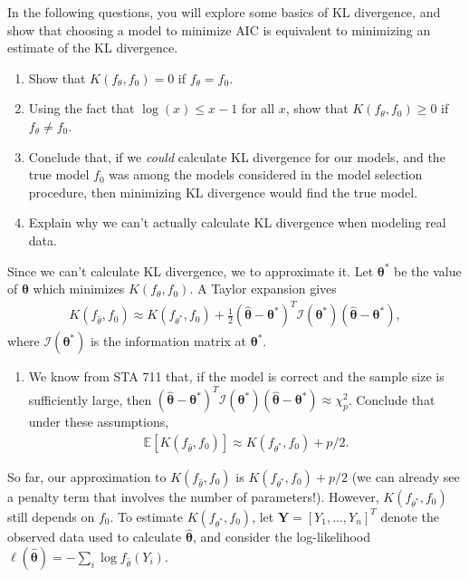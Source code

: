\documentclass[11pt]{article}
\begin{document}
\noindent In the following questions, you will explore some basics of KL divergence, and show that choosing a model to minimize AIC is equivalent to minimizing an estimate of the KL divergence.

\begin{enumerate}
\item Show that $K(f_\theta, f_0) = 0$ if $f_\theta = f_0$.

\item Using the fact that $\log(x) \leq x - 1$ for all $x$, show that $K(f_\theta, f_0) \geq 0$ if $f_\theta \neq f_0$.

\item Conclude that, if we \textit{could} calculate KL divergence for our models, and the true model $f_0$ was among the models considered in the model selection procedure, then minimizing KL divergence would find the true model.

\item Explain why we can't actually calculate KL divergence when modeling real data.
\end{enumerate}

\noindent Since we can't calculate KL divergence, we to approximate it. Let $\bm{\theta}^*$ be the value of $\bm{\theta}$ which minimizes $K(f_\theta, f_0)$. A Taylor expansion gives
\begin{align}
K(f_{\widehat{\theta}}, f_0) \approx K(f_{\theta^*}, f_0) + \frac{1}{2} (\widehat{\bm{\theta}} - \bm{\theta}^*)^T \mathcal{I}(\bm{\theta}^*) (\widehat{\bm{\theta}} - \bm{\theta}^*),
\end{align}
where $\mathcal{I}(\bm{\theta}^*)$ is the information matrix at $\bm{\theta}^*$.

\begin{enumerate}
\item We know from STA 711 that, if the model is correct and the sample size is sufficiently large, then $(\widehat{\bm{\theta}} - \bm{\theta}^*)^T \mathcal{I}(\bm{\theta}^*) (\widehat{\bm{\theta}} - \bm{\theta}^*) \approx \chi^2_p$. Conclude that under these assumptions,
\begin{align}
\mathbb{E}[K(f_{\widehat{\theta}}, f_0)] \approx K(f_{\theta^*}, f_0) + p/2.
\end{align}
\end{enumerate}

\noindent So far, our approximation to $K(f_{\widehat{\theta}}, f_0)$ is $K(f_{\theta^*}, f_0) + p/2$ (we can already see a penalty term that involves the number of parameters!). However, $K(f_{\theta^*}, f_0)$ still depends on $f_0$. To estimate $K(f_{\theta^*}, f_0)$, let $\bm{Y} = [Y_1,...,Y_n]^T$ denote the observed data used to calculate $\widehat{\bm{\theta}}$, and consider the log-likelihood $\ell(\widehat{\bm{\theta}}) = -\sum_i \log f_{\widehat{\theta}}(Y_i)$.
\end{document}
